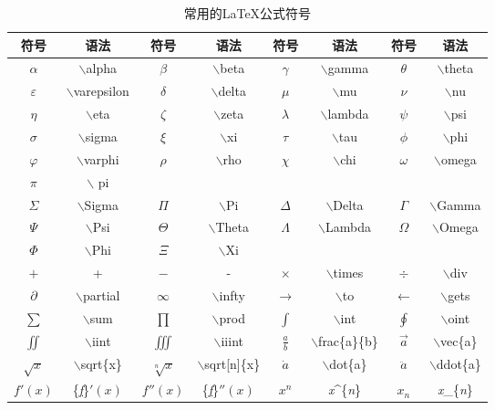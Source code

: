 \documentclass{article}
\begin{document}
			\begin{table}[H]
				\centering
				\caption{常用的\LaTeX 公式符号}
				\setlength{\tabcolsep}{10pt}
				\begin{tabular}{cc|cc|cc|cc}
					\toprule
						\textbf{符号} & \textbf{语法} & \textbf{符号} & \textbf{语法} & \textbf{符号} & \textbf{语法} & \textbf{符号} & \textbf{语法} \\
					\midrule
						$\alpha$ & $\backslash$alpha & $\beta$ & $\backslash$beta & $\gamma$ & $\backslash$gamma & $\theta$ & $\backslash$theta \\
						$\varepsilon$ & $\backslash$varepsilon & $\delta$ & $\backslash$delta & $\mu$ & $\backslash$mu & $\nu$ & $\backslash$nu \\
						$\eta$ & $\backslash$eta & $\zeta$ & $\backslash$zeta & $\lambda$ & $\backslash$lambda & $\psi$ & $\backslash$psi \\
						$\sigma$ & $\backslash$sigma & $\xi$ & $\backslash$xi & $\tau$ & $\backslash$tau & $\phi$ & $\backslash$phi \\
						$\varphi$ & $\backslash$varphi & $\rho$ & $\backslash$rho & $\chi$ & $\backslash$chi & $\omega$ & $\backslash$omega \\
						$\pi$ & $\backslash$ pi &  &  &  &  &  &  \\
					\midrule
						$\Sigma$ & $\backslash$Sigma & $\Pi$ & $\backslash$Pi & $\Delta$ & $\backslash$Delta & $\Gamma$ & $\backslash$Gamma \\
						$\Psi$ & $\backslash$Psi & $\Theta$ & $\backslash$Theta & $\Lambda$ & $\backslash$Lambda & $\Omega$ & $\backslash$Omega \\
						$\Phi$ & $\backslash$Phi & $\Xi$ & $\backslash$Xi &  &  &  &  \\
					\midrule
						$+$ & + & $-$ & - & $\times$ & $\backslash$times & $\div$ & $\backslash$div \\
						$\partial$ & $\backslash$partial & $\infty$ & $\backslash$infty & $\to$ & $\backslash$to & $\gets$ & $\backslash$gets \\	
					\midrule
						$\sum$ & $\backslash$sum & $\prod$ & $\backslash$prod & $\int$ & $\backslash$int & $\oint$ & $\backslash$oint \\
						$\iint$ & $\backslash$iint & $\iiint$ & $\backslash$iiint & $\frac{a}{b}$ & $\backslash$frac\{a\}\{b\} & $\vec{a}$ & $\backslash$vec\{a\} \\
						$\sqrt{x}$ & $\backslash$sqrt\{x\} & $\sqrt[n]{x}$ & $\backslash$sqrt[n]\{x\} & $\dot{a}$ & $\backslash$dot\{a\} & $\ddot{a}$ & $\backslash$ddot\{a\} \\
						${f}'(x)$ & \{\underline{\textit{f}}\}$'(x)$ & ${f}''(x)$ & \{\underline{\textit{f}}\}$''(x)$ & $x^{n}$ & \textit{x}\^{}\{\textit{n}\} & $x_{n}$ & \textit{x}\_\{\textit{n}\} \\
					\bottomrule
				\end{tabular}
				\label{table5}
			\end{table}
			
\end{document}
